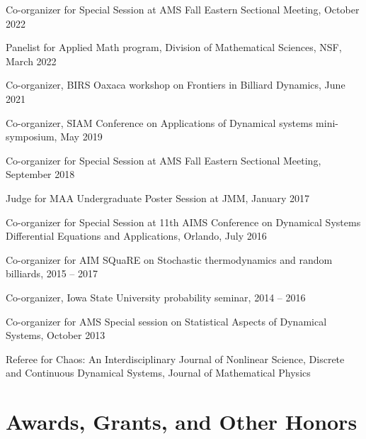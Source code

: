 \documentclass[10pt,letterpaper]{article}
\renewenvironment{itemize}{
  \begin{list}{}{
    \setlength{\leftmargin}{1.5em}
    \setlength{\itemsep}{0.25em}
    \setlength{\parskip}{0pt}
    \setlength{\parsep}{0.25em}
  }
}{
  \end{list}
}
\providecommand{\tightlist}{%
  \setlength{\itemsep}{0pt}\setlength{\parskip}{0pt}}
\let\tightlist\relax
\begin{document}
\begin{itemize}
\tightlist
\item
  Co-organizer for Special Session at AMS Fall Eastern Sectional
  Meeting, October 2022
\item
  Panelist for Applied Math program, Division of Mathematical Sciences,
  NSF, March 2022
\item
  Co-organizer, BIRS Oaxaca workshop on Frontiers in Billiard Dynamics,
  June 2021
\item
  Co-organizer, SIAM Conference on Applications of Dynamical systems
  mini-symposium, May 2019
\item
  Co-organizer for Special Session at AMS Fall Eastern Sectional
  Meeting, September 2018
\item
  Judge for MAA Undergraduate Poster Session at JMM, January 2017
\item
  Co-organizer for Special Session at 11th AIMS Conference on Dynamical
  Systems Differential Equations and Applications, Orlando, July 2016
\item
  Co-organizer for AIM SQuaRE on Stochastic thermodynamics and random
  billiards, 2015 -- 2017
\item
  Co-organizer, Iowa State University probability seminar, 2014 -- 2016
\item
  Co-organizer for AMS Special session on Statistical Aspects of
  Dynamical Systems, October 2013
\item
  Referee for Chaos: An Interdisciplinary Journal of Nonlinear Science,
  Discrete and Continuous Dynamical Systems, Journal of Mathematical
  Physics
\end{itemize}

\hypertarget{awards-grants-and-other-honors}{%
\section*{Awards, Grants, and Other
Honors}\label{awards-grants-and-other-honors}}
\end{document}
